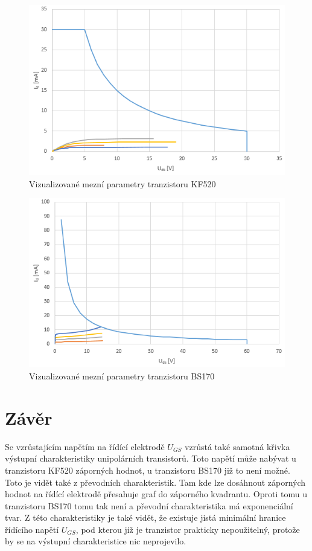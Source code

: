 \documentclass[12pt]{article} %
\begin{document}
\begin{figure}[H]
\center
\includegraphics[scale=0.9]{mezni_kf520.png}
\caption{Vizualizované mezní parametry tranzistoru KF520}
\end{figure}

\begin{figure}[H]
\center
\includegraphics[scale=0.9]{mezni_bs170.png}
\caption{Vizualizované mezní parametry tranzistoru BS170}
\end{figure}

\section{Závěr}
Se vzrůstajícím napětím na řídící elektrodě $U_{GS}$ vzrůstá také samotná křivka výstupní charakteristiky unipolárních transistorů. Toto napětí může nabývat u tranzistoru KF520 záporných hodnot, u tranzistoru BS170 již to není možné. Toto je vidět také z převodních charakteristik. Tam kde lze dosáhnout záporných hodnot na řídící elektrodě přesahuje graf do záporného kvadrantu. Oproti tomu u tranzistoru BS170 tomu tak není a převodní charakteristika má exponenciální tvar. Z této charakteristiky je také vidět, že existuje jistá minimální hranice řídícího napětí $U_{GS}$, pod kterou již je tranzistor prakticky nepoužitelný, protože by se na výstupní charakteristice nic neprojevilo.
\end{document}
